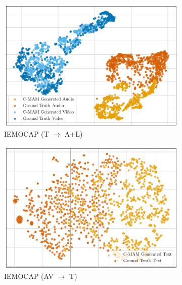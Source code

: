 \begin{figure}[!p]
\begin{subfigure}[b]{0.24\textwidth}
        \includegraphics[width=\textwidth]{imgs/tsne/mmin/iemocap/cmam_text_tsne.png}
        \caption*{IEMOCAP (T $\rightarrow$ A+L)}
    \end{subfigure}
    \begin{subfigure}[b]{0.24\textwidth}
        \centering
        \includegraphics[width=\textwidth]{imgs/tsne/mmin/iemocap/cmam_gen_text_with_av.png}
        \caption*{IEMOCAP (AV $\rightarrow$ T)}
    \end{subfigure}
    \begin{subfigure}[b]{0.24\textwidth}
        \centering

\end{subfigure}
\end{figure}
